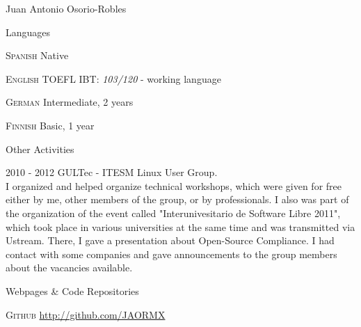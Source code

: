 \documentclass[english,10pt,letterpaper]{article}
\begin{document}
\begin{cv}{Juan Antonio Osorio-Robles}
	\begin{cvlist}{Languages}
		\item [\textsc {Spanish}]
				Native
		\item [\textsc {English}]
				TOEFL IBT: \emph{103/120} - working language
		\item [\textsc {German}]
				Intermediate, 2 years
		\item [\textsc {Finnish}]
				Basic, 1 year
		\end{cvlist}

	\begin{cvlist}{Other Activities}
		\item [2010 - 2012] GULTec - ITESM Linux User Group.\\
			I organized and helped organize technical workshops, which were
            given for free either by me, other members of the group, or by
            professionals. I also was part of the organization of the event
            called "Interunivesitario de Software Libre 2011", which took place
            in various universities at the same time and was transmitted via
            Ustream. There, I gave a presentation about Open-Source Compliance.
            I had contact with some companies and gave announcements to the
            group members about the vacancies available.
	\end{cvlist}

	\begin{cvlist}{Webpages \& Code Repositories}
        \item [\textsc{Github}]
            \href{http://github.com/JAORMX}{http://github.com/JAORMX}
	\end{cvlist}

\end{cv}
\end{document}
